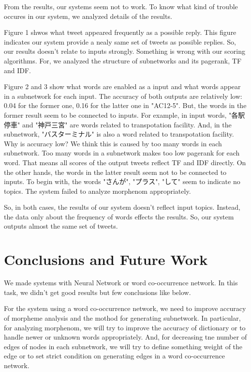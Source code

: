 \documentclass{../style/sig-alternate}
\begin{document}
From the results, our systems seem not to work. To know what kind of trouble occures in our system, we analyzed details of the results.


Figure 1 shwos what tweet appeared frequently as a possible reply. This figure indicates our system provide a nealy same set of tweets as possible replies. So, our results doesn't relate to inputs strongly. Something is wrong with our scoring algorithms. For, we analyzed the structure of subnetworks and its pagerank, TF and IDF.


Figure 2 and 3 show what words are enabled as a input and what words appear in a subnetwork for each input.
The accuracy of both outputs are relatively low: 0.04 for the former one, 0.16 for the latter one in "AC12-5". But, the words in the former result seem to be connected to inputs. For example, in input words, "各駅停車" and "神戸三宮" are words related to transpotation facility. And, in the subnetwork, "バスターミナル" is also a word related to transpotation facility. Why is accuracy low? We think this is caused by too many words in each subnetwork. Too many words in a subnetwork makes too low pagerank for each word. That means all scores of the output tweets reflect TF and IDF directly.
On the other hands, the words in the latter result seem not to be connected to inputs. To begin with, the words "さんが", "プラス", "して" seem to indicate no topics. The system failed to analyze morphenom appropriately.

So, in both cases, the results of our system doesn't reflect input topics. Instead, the data only about the frequency of words effects the results. So, our system outputs almost the same set of tweets.

\section{Conclusions and Future Work}
\label{sec:conclusions}
We made systems with Neural Network or word co-occurrence network. In this task, we didn't get good results but few conclusions like below.

For the system using a word co-occurrence network, we need to improve accuracy of morpheme analysis and the mothod for generating subnetwork.
In particular, for analyzing morphenom, we will try to improve the accuracy of dictionary or to handle newer or unknown words appropriately. And, for decreasing tne number of edges of nodes in each subnetwork, we will try to define something weight of the edge or to set strict condition on generating edges in a word co-occurrence network.
\end{document}
